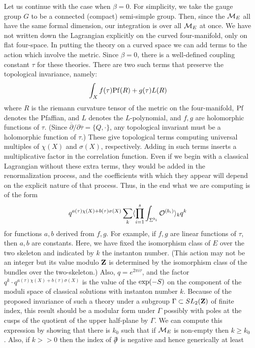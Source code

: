 \documentclass[10pt]{article}
\def\cancel#1#2{\ooalign{$\hfil#1\mkern1mu/\hfil$\crcr$#1#2$}}
\def\dirac{\mathpalette\cancel\partial}
\def\ov{\overline}
\begin{document}
Let us continue with the case when $\beta=0$. 
For simplicity, we take the gauge group $G$ to be a connected
(compact) semi-simple group.
Then, since the ${\cal
M}_E$ all have the same formal dimension, our integration is
over all ${\cal M}_E$ at once.
We have not written down the
Lagrangian explicitly on the curved four-manifold, only on flat
four-space. In putting the theory on a curved space we can add terms
to the action which involve the metric.
Since $\beta=0$, there is a well-defined coupling constant  $\tau$ for
these theories.
  There are two such terms
that preserve the topological invariance, namely:
$$\int_Xf(\tau){\rm Pf}(R)+g(\tau)L(R)$$
where $R$ is the riemann curvature tensor of the metric on the
four-manifold, ${\rm Pf}$ denotes the Pfaffian, and $L$ denotes the
$L$-polynomial, and $f,g$ are holomorphic functions of $\tau$.
(Since $\ov\partial/\partial\ov\tau=\{Q,\cdot\}$, any topological
invariant must be a holomorphic function of $\tau$.)
These give topological terms computing universal multiples of
$\chi(X)$ and $\sigma(X)$, respectively. 
Adding in such terms inserts a multiplicative factor in
the correlation function.
Even if we begin with a classical Lagrangian without these extra
terms, they would be added in the renormalization process, and the
coefficients with which they appear will depend on the explicit nature
of that process.
 Thus, in the end what we are computing is
 of the form
$$q^{a(\tau)\chi(X)+b(\tau)\sigma(X)}\sum_k\langle
\prod_{i=1}^s\int_{\Sigma^{b_i}}{\cal O}^{(b_i)}\rangle_kq^k$$
for functions $a,b$ derived from $f,g$. For example, if $f,g$ are
linear functions of $\tau$, then $a,b$ are constants.
Here, we have fixed the isomorphism class of $E$ over the two skeleton
and indicated by  $k$   the instanton number.
(This action may not be an integer but its value modulo $\bf Z$ is
determined by the isomorphism class of the bundles over the two-skeleton.)
Also, $q=e^{2\pi i\tau}$, and 
the factor $q^k\cdot q^{a(\tau)\chi(X)+b(\tau)\sigma(X)}$ is the value
of the ${\rm exp}(-S)$ on the component  of the moduli space of classical
solutions with instanton number $k$.
Because of the proposed invariance of such a theory under a subgroup
$\Gamma\subset SL_2({\bf Z})$  of finite index, this result should
be a modular form under $\Gamma$ possibly with poles at the cusps of
the quotient of the upper half-plane by $\Gamma$.
We can compute this expression by showing that there is $k_0$ such
that if ${\cal M}_E$ is non-empty then $k\ge k_0$. Also, if $k>>0$
then the index of $\dirac$ is negative and hence generically at least
\end{document}
